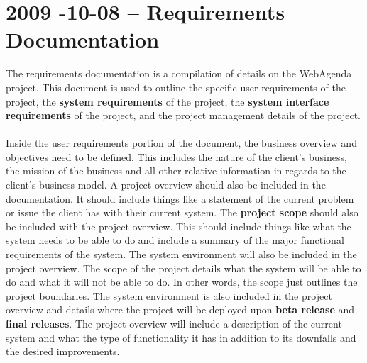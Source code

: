 \documentclass[letterpaper,12pt]{report}
\begin{document}
\pagebreak

\section{2009 -10-08 – Requirements Documentation}
\hspace{1cm}The requirements documentation is a compilation of details on the WebAgenda project. This document is used to outline the specific user requirements of the project, the \textbf{system requirements} of the project, the \textbf{system interface requirements} of the project, and the project management details of the project.
\paragraph*{}Inside the user requirements portion of the document, the business overview and objectives need to be defined. This includes the nature of the client’s business, the mission of the business and all other relative information in regards to the client’s business model. A project overview should also be included in the documentation. It should include things like a statement of the current problem or issue the client has with their current system. The \textbf{project scope} should also be included with the project overview. This should include things like what the system needs to be able to do and include a summary of the major functional requirements of the system. The system environment will also be included in the project overview. The scope of the project details what the system will be able to do and what it will not be able to do. In other words, the scope just outlines the project boundaries. The system environment is also included in the project overview and details where the project will be deployed upon \textbf{beta release} and \textbf{final releases}. The project overview will include a description of the current system and what the type of functionality it has in addition to its downfalls and the desired improvements.
\end{document}
